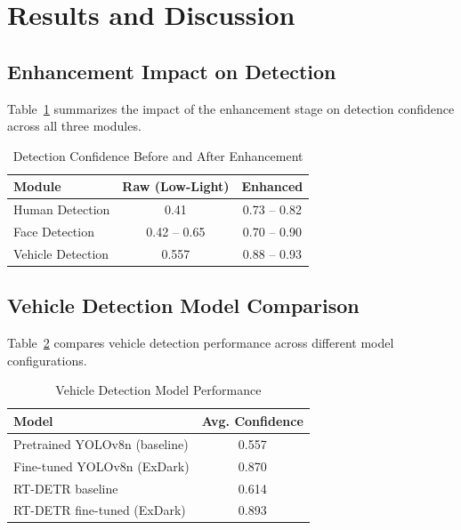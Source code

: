 \documentclass[conference]{IEEEtran}
\begin{document}
\section{Results and Discussion}

\subsection{Enhancement Impact on Detection}

Table~\ref{tab:enhancement} summarizes the impact of the enhancement stage on detection confidence across all three modules.

\begin{table}[htbp]
\caption{Detection Confidence Before and After Enhancement}
\begin{center}
\begin{tabular}{lcc}
\toprule
\textbf{Module} & \textbf{Raw (Low-Light)} & \textbf{Enhanced} \\
\midrule
Human Detection & 0.41 & 0.73 -- 0.82 \\
Face Detection & 0.42 -- 0.65 & 0.70 -- 0.90 \\
Vehicle Detection & 0.557 & 0.88 -- 0.93 \\
\bottomrule
\end{tabular}
\label{tab:enhancement}
\end{center}
\end{table}

\subsection{Vehicle Detection Model Comparison}

Table~\ref{tab:vehicle} compares vehicle detection performance across different model configurations.

\begin{table}[htbp]
\caption{Vehicle Detection Model Performance}
\begin{center}
\begin{tabular}{lc}
\toprule
\textbf{Model} & \textbf{Avg. Confidence} \\
\midrule
Pretrained YOLOv8n (baseline) & 0.557 \\
Fine-tuned YOLOv8n (ExDark) & 0.870 \\
RT-DETR baseline & 0.614 \\
RT-DETR fine-tuned (ExDark) & 0.893 \\
\bottomrule
\end{tabular}
\label{tab:vehicle}
\end{center}
\end{table}
\end{document}
